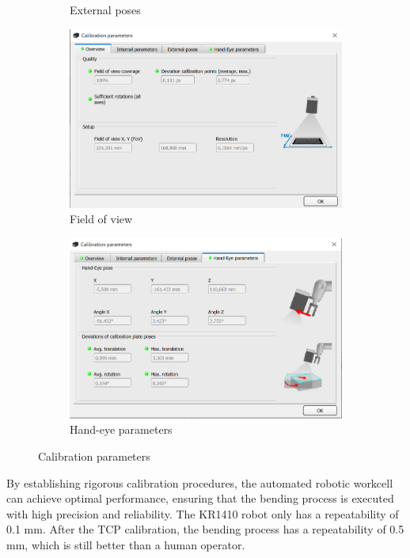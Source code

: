 \begin{figure}[h]
\begin{subfigure}{0.48\textwidth}
        \caption{External poses}
        \label{subfig:external-poses}
    \end{subfigure}
    \begin{subfigure}{0.48\textwidth}
        \centering
        \includegraphics[width=\textwidth]{figures/001calibration/fov.PNG}
        \caption{Field of view}
        \label{subfig:fov}
    \end{subfigure}
    \begin{subfigure}{0.48\textwidth}
        \centering
        \includegraphics[width=\textwidth]{figures/001calibration/hand-eye_parameters.PNG}
        \caption{Hand-eye parameters}
        \label{subfig:hand-eye-parameters}
    \end{subfigure}
    \caption{Calibration parameters}
    \label{fig:calibration-parameters}
\end{figure}


By establishing rigorous calibration procedures, the automated robotic workcell can achieve optimal performance, ensuring that the bending process is executed with high precision and reliability.  The KR1410 robot only has a repeatability of 0.1 mm. After the TCP calibration, the bending process has a repeatability of 0.5 mm, which is still better than a human operator.
